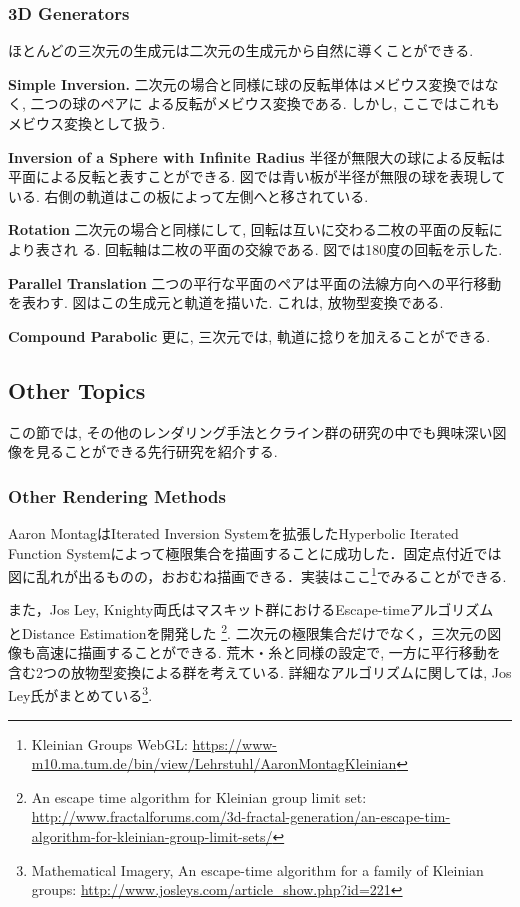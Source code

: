 \subsubsection{3D Generators}
ほとんどの三次元の生成元は二次元の生成元から自然に導くことができる.

\noindent\textbf{Simple Inversion.}
二次元の場合と同様に球の反転単体はメビウス変換ではなく, 二つの球のペアに
よる反転がメビウス変換である.
しかし, ここではこれもメビウス変換として扱う.

\noindent\textbf{Inversion of a Sphere with Infinite Radius}
半径が無限大の球による反転は平面による反転と表すことができる.
図では青い板が半径が無限の球を表現している.
右側の軌道はこの板によって左側へと移されている.

\noindent\textbf{Rotation}
二次元の場合と同様にして, 回転は互いに交わる二枚の平面の反転により表され
る.
回転軸は二枚の平面の交線である.
図では180度の回転を示した.

\noindent\textbf{Parallel Translation}
二つの平行な平面のペアは平面の法線方向への平行移動を表わす.
図はこの生成元と軌道を描いた.
これは, 放物型変換である.

\noindent\textbf{Compound Parabolic}
更に, 三次元では, 軌道に捻りを加えることができる.

\subsection{Other Topics}

この節では, その他のレンダリング手法とクライン群の研究の中でも興味深い図像を見ることができる先行研究を紹介する.

\subsubsection{Other Rendering Methods}
Aaron MontagはIterated Inversion Systemを拡張したHyperbolic Iterated Function Systemによって極限集合を描画することに成功した\cite{hyperbolicIFS}．固定点付近では図に乱れが出るものの，おおむね描画できる．実装はここ\footnote{Kleinian Groups WebGL: \url{https://www-m10.ma.tum.de/bin/view/Lehrstuhl/AaronMontagKleinian}}でみることができる.

また，Jos Ley, Knighty両氏はマスキット群におけるEscape-timeアルゴリズム
とDistance Estimationを開発した
\footnote{An escape time algorithm for Kleinian group limit set:\\ \quad
\quad \url{http://www.fractalforums.com/3d-fractal-generation/an-escape-tim-algorithm-for-kleinian-group-limit-sets/}}.
 二次元の極限集合だけでなく，三次元の図像も高速に描画することができる.
荒木・糸\cite{maskit}と同様の設定で, 一方に平行移動を含む2つの放物型変換による群を考えている.
詳細なアルゴリズムに関しては, Jos Ley氏がまとめている\footnote{Mathematical Imagery, An escape-time algorithm for a family of Kleinian groups: \url{http://www.josleys.com/article_show.php?id=221}}.

